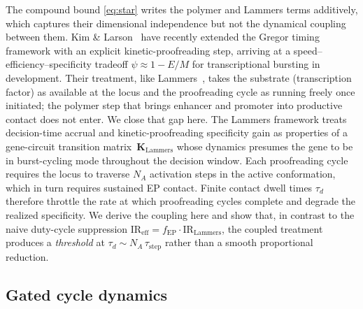 \documentclass[11pt]{article}
\newcommand{\EP}{\mathrm{EP}}
\begin{document}
The compound bound \eqref{eq:star} writes the polymer and Lammers terms
additively, which captures their dimensional independence but not the
dynamical coupling between them. Kim \& Larson~\cite{KimLarson2025} have
recently extended the Gregor timing framework with an explicit
kinetic-proofreading step, arriving at a speed--efficiency--specificity
tradeoff $\psi\approx 1-E/M$ for transcriptional bursting in development.
Their treatment, like Lammers~\cite{Lammers2023}, takes the substrate
(transcription factor) as available at the locus and the proofreading
cycle as running freely once initiated; the polymer step that brings
enhancer and promoter into productive contact does not enter. We close
that gap here. The Lammers framework treats decision-time accrual and
kinetic-proofreading specificity gain as properties of a gene-circuit
transition matrix~$\mathbf{K}_{\text{Lammers}}$ whose dynamics presumes
the gene to be in burst-cycling mode throughout the decision window. Each proofreading cycle requires the locus to
traverse $N_A$ activation steps in the active conformation, which in turn
requires sustained EP contact. Finite contact dwell times $\tau_d$
therefore throttle the rate at which proofreading cycles complete and
degrade the realized specificity. We derive the coupling here and show
that, in contrast to the naive duty-cycle suppression
$\mathrm{IR}_{\mathrm{eff}} = f_{\EP}\cdot\mathrm{IR}_{\mathrm{Lammers}}$,
the coupled treatment produces a \emph{threshold} at $\tau_d\sim
N_A\,\tau_{\mathrm{step}}$ rather than a smooth proportional reduction.

\subsection{Gated cycle dynamics}
\end{document}
